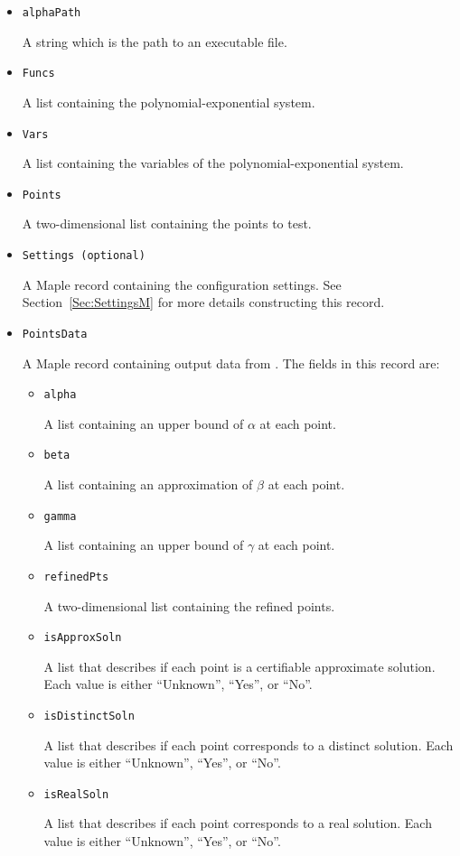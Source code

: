 \documentclass[11pt]{report}
\begin{document}
\begin{itemize}

\item {\tt alphaPath}

A string which is the path to an \blueharvestS executable file.

\item {\tt Funcs}

A list containing the polynomial-exponential system.

\item {\tt Vars}

A list containing the variables of the polynomial-exponential system.

\item {\tt Points}

A two-dimensional list containing the points to test.

\item {\tt Settings (optional)}

A Maple record containing the configuration settings.
See Section~\ref{Sec:SettingsM} for more details constructing
this record.

\item {\tt PointsData}

A Maple record containing output data from \blueharvest.
The fields in this record are:
\begin{itemize}
 \item {\tt alpha}

A list containing an upper bound of $\alpha$ at each point.

 \item {\tt beta}

A list containing an approximation of $\beta$ at each point.

 \item {\tt gamma}

A list containing an upper bound of $\gamma$ at each point.

 \item {\tt refinedPts}

A two-dimensional list containing the refined points.

 \item {\tt isApproxSoln}

A list that describes if each point is a certifiable approximate solution.
Each value is either ``Unknown'', ``Yes'', or ``No''.

 \item {\tt isDistinctSoln}

A list that describes if each point corresponds to a distinct solution.
Each value is either ``Unknown'', ``Yes'', or ``No''.

 \item {\tt isRealSoln}

A list that describes if each point corresponds to a real solution.
Each value is either ``Unknown'', ``Yes'', or ``No''.

\end{itemize}
\end{itemize}
\end{document}
